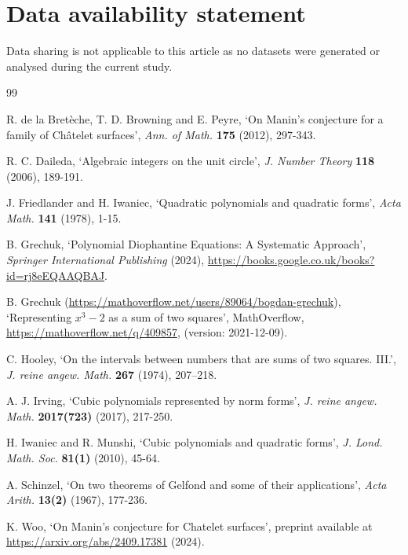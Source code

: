 \documentclass[12pt]{amsart}
\newcommand{\1}{\mathmybb{1}}
\begin{document}
\section{Data availability statement}
Data sharing is not applicable to this article as no datasets were generated or analysed during the current study.
\begin{thebibliography}{99}


 R. de la Bret{\`e}che, T. D. Browning and E. Peyre, `On Manin’s conjecture for a family of Ch\^{a}telet surfaces', {\it Ann. of Math.} \textbf{175} (2012), 297-343.

 R. C. Daileda, `Algebraic integers on the unit circle', {\it J. Number Theory} \textbf{118} (2006), 189-191.

 J. Friedlander and H. Iwaniec, `Quadratic polynomials and quadratic forms', {\it Acta Math.} \textbf{141} (1978), 1-15.

 B. Grechuk,  `Polynomial Diophantine Equations: A Systematic Approach', {\it Springer International
Publishing} (2024), \url{https://books.google.co.uk/books?id=rj8eEQAAQBAJ}.

 B. Grechuk (\url{https://mathoverflow.net/users/89064/bogdan-grechuk}), `Representing $x^3-2$ as a sum of two squares', MathOverflow, \url{ https://mathoverflow.net/q/409857},  (version: 2021-12-09).

 C. Hooley, `On the intervals between numbers that are sums of two squares. III.', {\it J. reine angew. Math.} {\bf 267} (1974), 207--218.

 A. J. Irving, `Cubic polynomials represented by norm forms', {\it J. reine angew. Math.} \textbf{2017(723)} (2017), 217-250.

 H. Iwaniec and R. Munshi, `Cubic polynomials and quadratic forms', {\it J. Lond. Math. Soc.} \textbf{81(1)} (2010), 45-64.

 A. Schinzel, `On two theorems of Gelfond and some of their applications', {\it Acta Arith.} \textbf{13(2)} (1967), 177-236.

 K. Woo, `On Manin’s conjecture for Chatelet surfaces', preprint available at \url{https://arxiv.org/abs/2409.17381} (2024).

\end{thebibliography}
\end{document}
